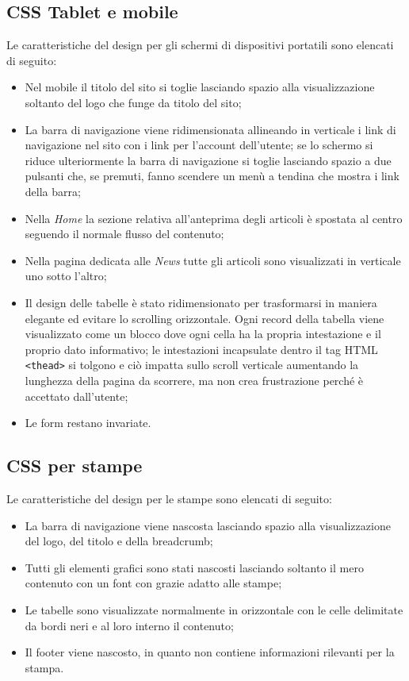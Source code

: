     \subsection{CSS Tablet e mobile}
    Le caratteristiche del design per gli schermi di dispositivi portatili sono elencati di seguito:
    \begin{itemize}
        \item Nel mobile il titolo del sito si toglie lasciando spazio alla visualizzazione soltanto del logo che funge da titolo del sito;
        \item La barra di navigazione viene ridimensionata allineando in verticale i link di navigazione nel sito con i link per l'account dell'utente; se lo schermo si riduce ulteriormente la barra di navigazione si toglie lasciando spazio a due pulsanti che, se premuti, fanno scendere un menù a tendina che mostra i link della barra;
        \item Nella \textit{Home} la sezione relativa all'anteprima degli articoli è spostata al centro seguendo il normale flusso del contenuto;
        \item Nella pagina dedicata alle \textit{News} tutte gli articoli sono visualizzati in verticale uno sotto l'altro;
        \item Il design delle tabelle è stato ridimensionato per trasformarsi in maniera elegante ed evitare lo scrolling orizzontale. Ogni record della tabella viene visualizzato come un blocco dove ogni cella ha la propria intestazione e il proprio dato informativo; le intestazioni incapsulate dentro il tag HTML \texttt{<thead>} si tolgono e ciò impatta sullo scroll verticale aumentando la lunghezza della pagina da scorrere, ma non crea frustrazione perché è accettato dall'utente;
        \item Le form restano invariate.
    \end{itemize}
    
    \subsection{CSS per stampe}
    Le caratteristiche del design per le stampe sono elencati di seguito:
    \begin{itemize}
        \item La barra di navigazione viene nascosta lasciando spazio alla visualizzazione del logo, del titolo e della breadcrumb;
        \item Tutti gli elementi grafici sono stati nascosti lasciando soltanto il mero contenuto con un font con grazie adatto alle stampe;
        \item Le tabelle sono visualizzate normalmente in orizzontale con le celle delimitate da bordi neri e al loro interno il contenuto;
        \item Il footer viene nascosto, in quanto non contiene informazioni rilevanti per la stampa.
    \end{itemize}